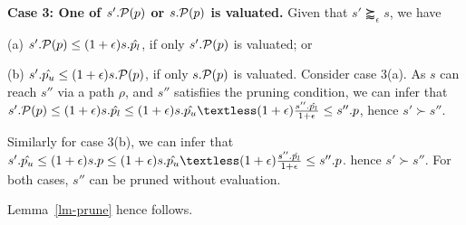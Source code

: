 \sstab
\textbf{Case 3: One of $s'.\P(p)$ or $s.\P(p)$ is valuated.}
Given that $s' \succapprox_{\epsilon} s$, we have  
\bi
\item (a) $s'.\P(p) \leq (1+\epsilon) s.\hat{p_l}$, if only $s'.\P(p)$ is valuated; or 
\item (b) $s'.\hat{p_u} \leq (1+\epsilon) s.\P(p)$, if only $s.\P(p)$ is valuated.
\ei
Consider case 3(a). 
As $s$ can reach $s''$ via a path $\rho$, and 
$s''$ satisfiies the pruning condition, 
we can infer that 
$s'.\P(p) \leq (1+\epsilon) s.\hat{p_l} \leq 
(1+\epsilon) s.\hat{p_u} \textless (1+\epsilon) 
\frac{s''.\hat{p_l}}{1+\epsilon}\leq s''.p$, 
hence $s'\succ s''$. 

Similarly for case 3(b), we can infer that   
$s'.\hat{p_u} \leq (1+\epsilon) s.p \leq 
(1+\epsilon) s.\hat{p_u} \textless (1+\epsilon) 
\frac{s''.\hat{p_l}}{1+\epsilon}\leq s''.p$. 
hence $s'\succ s''$.  
For both cases, $s''$ can be pruned 
without evaluation. 

Lemma~\ref{lm-prune} hence follows. 

